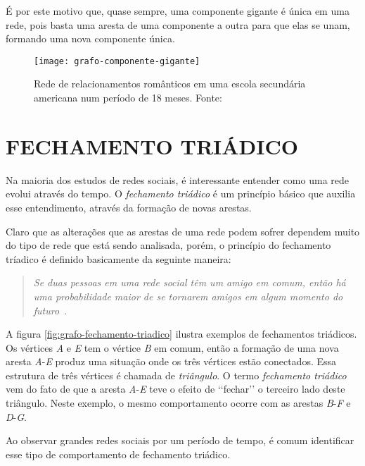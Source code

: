 É por este motivo que, quase sempre, uma componente gigante é única em uma rede, pois basta uma aresta de uma componente a outra para que elas se unam, formando uma nova componente única.

\begin{figure}[H]
\texttt{[image: grafo-componente-gigante]}
\centering
\caption{
    Rede de relacionamentos românticos em uma escola secundária americana num período de 18 meses. Fonte:~\cite{bearman2004chains}
}
\label{fig:grafo-componente-gigante}
\end{figure}

\section{\texorpdfstring{\MakeUppercase{Fechamento Triádico}}{}}
\label{conceitos__fechamento-triadico}

Na maioria dos estudos de redes sociais, é interessante entender como uma rede evolui através do tempo. O \emph{fechamento triádico} é um princípio básico que auxilia esse entendimento, através da formação de novas arestas.

Claro que as alterações que as arestas de uma rede podem sofrer dependem muito do tipo de rede que está sendo analisada, porém, o princípio do fechamento tríadico é definido basicamente da seguinte maneira:

\begin{quotation}
    \emph{Se duas pessoas em uma rede social têm um amigo em comum, então há uma probabilidade maior de se tornarem amigos em algum momento do futuro}~\cite{rapoport1953spread}.
\end{quotation}

A figura \ref{fig:grafo-fechamento-triadico} ilustra exemplos de fechamentos triádicos. Os vértices \emph{A} e \emph{E} tem o vértice \emph{B} em comum, então a formação de uma nova aresta \emph{A}-\emph{E} produz uma situação onde os três vértices estão conectados. Essa estrutura de três vértices é chamada de \emph{triângulo}. O termo \emph{fechamento triádico} vem do fato de que a aresta \emph{A}-\emph{E} teve o efeito de ‘‘fechar’’ o terceiro lado deste triângulo. Neste exemplo, o mesmo comportamento ocorre com as arestas \emph{B}-\emph{F} e \emph{D}-\emph{G}.

Ao observar grandes redes sociais por um período de tempo, é comum identificar esse tipo de comportamento de fechamento triádico.


